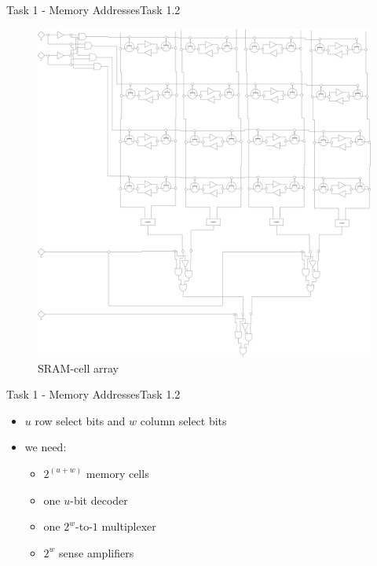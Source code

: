 \begin{frame}{Task 1 - Memory Addresses}{Task 1.2\vspace{0.25cm}}
  \begin{figure}
    \centering
    \includegraphics[height=0.6\paperheight]{./figures/sram.png}
    \caption{SRAM-cell array}
  \end{figure}
\end{frame}

\begin{frame}{Task 1 - Memory Addresses}{Task 1.2\vspace{0.25cm}}
  \begin{itemize}
    \item $u$ \alert{row} select bits and $w$ \alert{column} select bits
    \item \alert{we need:}
    \begin{itemize}
      \item $2^{(u+w)}$ memory cells
      \item one $u$-bit decoder
      \item one $2^w$-to-$1$ multiplexer
      \item $2^w$ sense amplifiers
    \end{itemize}
  \end{itemize}
\end{frame}

